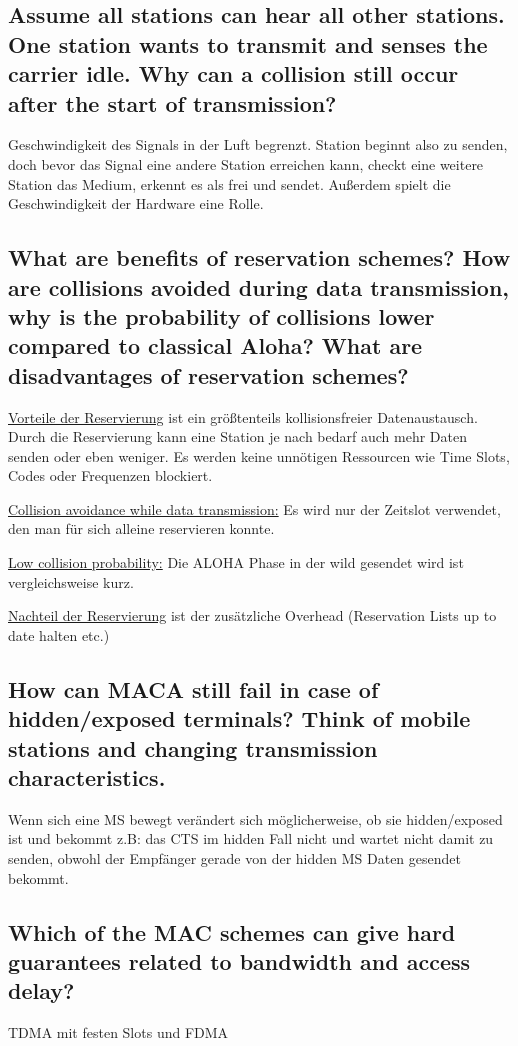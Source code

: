 \subsection{Assume all stations can hear all other stations. One station wants to transmit and
senses the carrier idle. Why can a collision still occur after the start of transmission?}
Geschwindigkeit des Signals in der Luft begrenzt. Station beginnt also zu senden, doch bevor das Signal eine andere Station erreichen kann, checkt eine weitere Station das Medium, erkennt es als frei und sendet.
Außerdem spielt die Geschwindigkeit der Hardware eine Rolle.

\subsection{What are benefits of reservation schemes? How are collisions avoided during data
transmission, why is the probability of collisions lower compared to classical Aloha?
What are disadvantages of reservation schemes?}

\underline{Vorteile der Reservierung} ist ein größtenteils kollisionsfreier Datenaustausch. Durch die Reservierung kann eine Station je nach bedarf auch mehr Daten senden oder eben weniger. Es werden keine unnötigen Ressourcen wie Time Slots, Codes oder Frequenzen blockiert.

\underline{Collision avoidance while data transmission:} Es wird nur der Zeitslot verwendet, den man für sich alleine reservieren konnte.

\underline{Low collision probability:} Die ALOHA Phase in der wild gesendet wird ist vergleichsweise kurz.

\underline{Nachteil der Reservierung} ist der zusätzliche Overhead (Reservation Lists up to date halten etc.)

\subsection{How can MACA still fail in case of hidden/exposed terminals? Think of mobile stations
and changing transmission characteristics.}
Wenn sich eine MS bewegt verändert sich möglicherweise, ob sie hidden/exposed ist und bekommt z.B: das CTS im hidden Fall nicht und wartet nicht damit zu senden, obwohl der Empfänger gerade von der hidden MS Daten gesendet bekommt.

\subsection{Which of the MAC schemes can give hard guarantees related to bandwidth and
access delay?} TDMA mit festen Slots und FDMA

